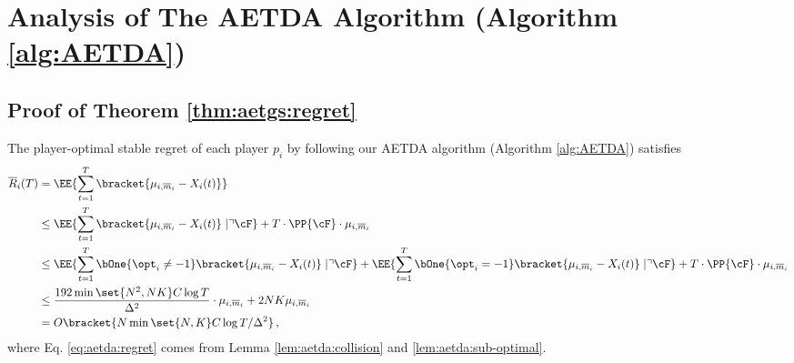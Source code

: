 
\section{Analysis of The AETDA Algorithm (Algorithm \ref{alg:AETDA})}
\label{sec:proof:aetda}



\subsection{Proof of Theorem \ref{thm:aetgs:regret}}

    The player-optimal stable regret of each player $p_i$ by following our AETDA algorithm (Algorithm \ref{alg:AETDA}) satisfies
\begin{align}
    \overline{R}_i(T) &=\EE{\sum_{t=1}^T \bracket{\mu_{i,\overline{m}_i} - X_{i}(t)} } \notag \\
    &\le \EE{\sum_{t=1}^T \bracket{\mu_{i,\overline{m}_i} - X_{i}(t)} \mid 
    \urcorner \cF } + T \cdot \PP{\cF } \cdot \mu_{i,\overline{m}_i}\notag \\
    &\le \EE{\sum_{t=1}^T \bOne{\opt_i \neq -1}\bracket{\mu_{i,\overline{m}_i} - X_{i}(t)} \mid 
    \urcorner \cF } + \EE{\sum_{t=1}^T \bOne{\opt_i = -1}\bracket{\mu_{i,\overline{m}_i} - X_{i}(t)} \mid 
    \urcorner \cF } + T \cdot \PP{\cF } \cdot \mu_{i,\overline{m}_i}\notag \\
    &\le \frac{192\min\set{N^2, NK} C\log T}{\Delta^2}\cdot \mu_{i,\overline{m}_i}  + 2NK \mu_{i,\overline{m}_i}  \label{eq:aetda:regret}  \\
    &= O\bracket{N\min\set{N,K}C\log T/\Delta^2} \notag \,,
\end{align}
where Eq. \eqref{eq:aetda:regret} comes from Lemma \ref{lem:aetda:collision} and \ref{lem:aetda:sub-optimal}. 




